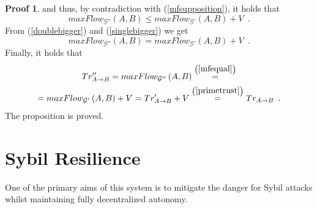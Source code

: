 \documentclass[11pt]{llncs}
\theoremstyle{definition}
\newtheorem{sepproof}{Proof}
\begin{document}
\begin{sepproof}
        and thus, by contradiction with (\ref{mfsupposition}), it holds that
        \begin{equation}
        \label{singlebigger}
           maxFlow_{\mathcal{G}''}\left(A, B\right) \leq maxFlow_{\mathcal{G}'}\left(A, B\right) + V \enspace.
        \end{equation}
        From (\ref{doublebigger}) and (\ref{singlebigger}) we get
        \begin{equation}
        \label{mfequal}
           maxFlow_{\mathcal{G}''}\left(A, B\right) = maxFlow_{\mathcal{G}'}\left(A, B\right) + V \enspace.
        \end{equation}
        Finally, it holds that
        \begin{equation}
        \begin{gathered}
           Tr''_{A \rightarrow B} = maxFlow_{\mathcal{G}''}\left(A, B\right) \overset{\left(\ref{mfequal}\right)}{=} \\
           = maxFlow_{\mathcal{G}'}\left(A, B\right) + V = Tr'_{A \rightarrow B} + V
           \overset{\left(\ref{primetrust}\right)}{=} Tr_{A \rightarrow B} \enspace.
        \end{gathered}
        \end{equation}
        The proposition is proved.
     \end{sepproof}
  \section{Sybil Resilience}
     One of the primary aims of this system is to mitigate the danger for Sybil attacks \cite{sybilattack} whilst maintaining
     fully decentralized autonomy.
\end{document}

